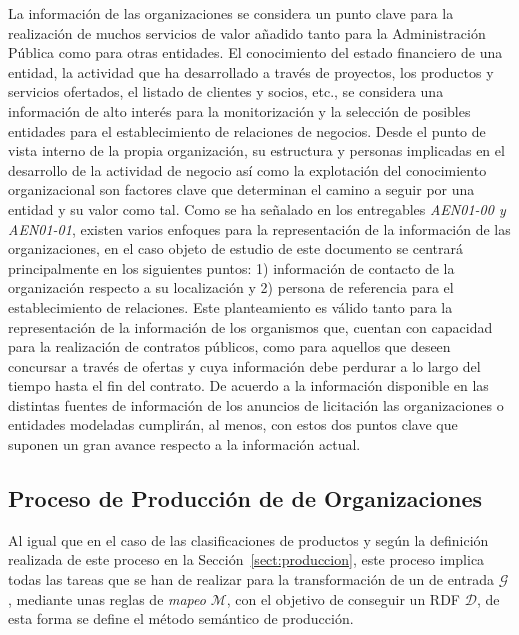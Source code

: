 La información de las organizaciones se considera un punto clave para la realización 
de muchos servicios de valor añadido tanto para la Administración Pública como 
para otras entidades. El conocimiento del estado financiero de una entidad, la actividad que ha desarrollado a 
través de proyectos, los productos y servicios ofertados, el listado de clientes y socios, etc., se considera una 
información de alto interés para la monitorización y la selección de posibles entidades 
para el establecimiento de relaciones de negocios. Desde el punto de vista interno de la propia organización, su estructura y 
personas implicadas en el desarrollo de la actividad de negocio así como la explotación del conocimiento organizacional 
son factores clave que determinan el camino a seguir por una entidad y su valor como tal. Como se ha señalado 
en los entregables \textit{AEN01-00 y AEN01-01}, existen varios enfoques para la representación de la información de las organizaciones, 
en el caso objeto de estudio de este documento se centrará principalmente en los siguientes puntos: 1) información 
de contacto de la organización respecto a su localización y 2) persona de referencia para el establecimiento de 
relaciones. Este planteamiento es válido tanto para la representación de la información de los organismos que, cuentan con capacidad 
para la realización de contratos públicos, como para aquellos que deseen concursar a través de ofertas y cuya información 
debe perdurar a lo largo del tiempo hasta el fin del contrato. De acuerdo a la información disponible en las distintas 
fuentes de información de los anuncios de licitación las organizaciones o entidades modeladas cumplirán, al menos, con estos 
dos puntos clave que suponen un gran avance respecto a la información actual.

\subsection{Proceso de Producción de \linkeddata de Organizaciones}
Al igual que en el caso de las clasificaciones de productos y según la definición realizada 
de este proceso en la Sección~\ref{sect:produccion}, este proceso implica todas las tareas 
que se han de realizar para la transformación de un \dataset de entrada $\mathcal{G}$, mediante 
unas reglas de \textit{mapeo} $\mathcal{M}$, con el objetivo de conseguir un \dataset \gls{RDF} $\mathcal{D}$, de esta forma 
se define el método semántico de producción. 

